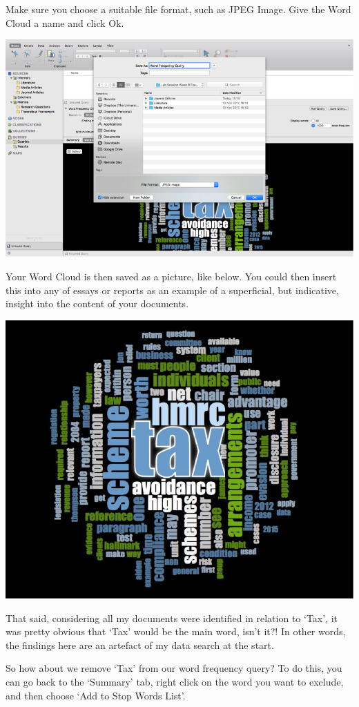 \documentclass[]{book}
\theoremstyle{definition}
\theoremstyle{definition}
\theoremstyle{definition}
\theoremstyle{remark}
\begin{document}
Make sure you choose a suitable file format, such as JPEG Image. Give
the Word Cloud a name and click Ok.

\includegraphics{imgs/qual_26.png}

Your Word Cloud is then saved as a picture, like below. You could then
insert this into any of essays or reports as an example of a
superficial, but indicative, insight into the content of your documents.

\includegraphics{imgs/qual_27.png}

That said, considering all my documents were identified in relation to
`Tax', it was pretty obvious that `Tax' would be the main word, isn't
it?! In other words, the findings here are an artefact of my data search
at the start.

So how about we remove `Tax' from our word frequency query? To do this,
you can go back to the `Summary' tab, right click on the word you want
to exclude, and then choose `Add to Stop Words List'.
\end{document}
